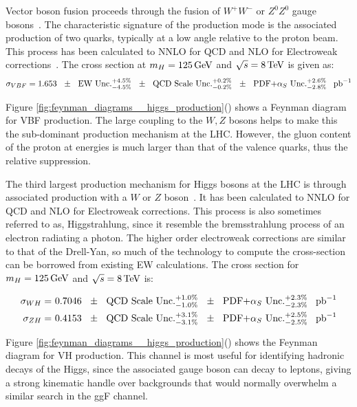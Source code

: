 \par Vector boson fusion proceeds through the fusion of $W^{+}W^{-}$
or $Z^{0}Z^{0}$  gauge bosons~\cite{th:HiggsXS_2013}. The
characteristic signature of the production mode is the associated
production of two quarks, typically at a low angle relative to the
proton beam.  This process has been calculated to NNLO for QCD and NLO
for Electroweak corrections~\cite{th:HiggsXS_2013}.  The cross section
at $m_{H} = 125\,\text{Ge\hspace{-.08em}V}$ and $\sqrt{s}=8\,\text{Te\hspace{-.08em}V}$ is given as:
\begin{equation}\label{eq:vbf_xs}
\sigma_{VBF} = 1.653~~\pm \text{~~EW Unc.}^{+4.5\%}_{-4.5\%}~~\pm
\text{~~QCD Scale Unc.}^{+0.2\%}_{-0.2\%}~~\pm
\text{~~PDF+$\alpha_{S}$ Unc.}^{+2.6\%}_{-2.8\%}~~\mbox{\ensuremath{\,\text{pb}^\text{$-$1}}} 
\end{equation}

\noindent Figure
\ref{fig:feynman_diagrams__higgs_production}() 
shows a Feynman diagram for VBF production.  The large coupling to the
$W,Z$ bosons helps to make this the sub-dominant production mechanism
at the LHC.  However, the gluon content of the proton at \TeV energies
is much larger than that of the valence quarks, thus the relative
suppression.  

\par The third largest production mechanism for Higgs bosons at the
LHC is through associated production with a $W$ or $Z$
boson~\cite{th:HiggsXS_2013}.  It has been calculated to NNLO for QCD
and NLO for Electroweak corrections. This process is also sometimes
referred to as, Higgstrahlung, since it resemble the bremsstrahlung
process of an electron radiating a photon. The higher order
electroweak corrections are similar to that of the Drell-Yan, so much
of the technology to compute the cross-section can be borrowed from
existing EW calculations.  The cross section for $m_{H} = 125\,\text{Ge\hspace{-.08em}V}$ and
$\sqrt{s}=8\,\text{Te\hspace{-.08em}V}$ is:  

\begin{equation}\label{eq:vh_xs}
\begin{aligned}
\sigma_{WH} =&~ 0.7046~~\pm \text{~~QCD Scale Unc.}^{+1.0\%}_{-1.0\%}~~\pm
\text{~~PDF+$\alpha_{S}$ Unc.}^{+2.3\%}_{-2.3\%}~~\mbox{\ensuremath{\,\text{pb}^\text{$-$1}}} \\
\sigma_{ZH} =&~ 0.4153~~\pm \text{~~QCD Scale Unc.}^{+3.1\%}_{-3.1\%}~~\pm
\text{~~PDF+$\alpha_{S}$ Unc.}^{+2.5\%}_{-2.5\%}~~\mbox{\ensuremath{\,\text{pb}^\text{$-$1}}} 
\end{aligned}
\end{equation}

\noindent Figure
\ref{fig:feynman_diagrams__higgs_production}()
shows the Feynman diagram for VH production.  This channel is most 
useful for identifying hadronic decays of the Higgs, since the
associated gauge boson can decay to leptons, giving a strong kinematic
handle over backgrounds that would normally overwhelm a similar search
in the ggF channel.  


